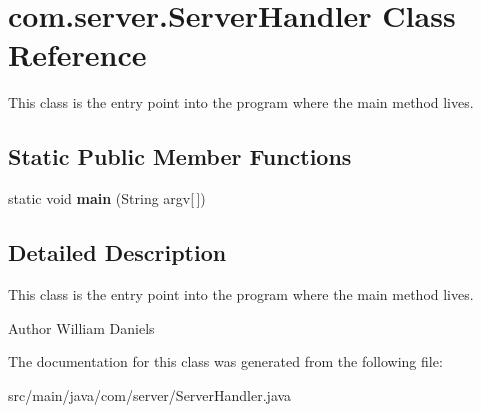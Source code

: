 \hypertarget{classcom_1_1server_1_1ServerHandler}{\section{com.\-server.\-Server\-Handler Class Reference}
\label{classcom_1_1server_1_1ServerHandler}
}


This class is the entry point into the program where the main method lives.  


\subsection*{Static Public Member Functions}
\begin{DoxyCompactItemize}
\item 
\hypertarget{classcom_1_1server_1_1ServerHandler_a49b67ff40a33f6094887b9e0cdada70f}{static void {\bfseries main} (String argv\mbox{[}$\,$\mbox{]})}\label{classcom_1_1server_1_1ServerHandler_a49b67ff40a33f6094887b9e0cdada70f}

\end{DoxyCompactItemize}


\subsection{Detailed Description}
This class is the entry point into the program where the main method lives. 

\begin{DoxyAuthor}{Author}
William Daniels 
\end{DoxyAuthor}


The documentation for this class was generated from the following file\-:\begin{DoxyCompactItemize}
\item 
src/main/java/com/server/Server\-Handler.\-java\end{DoxyCompactItemize}
